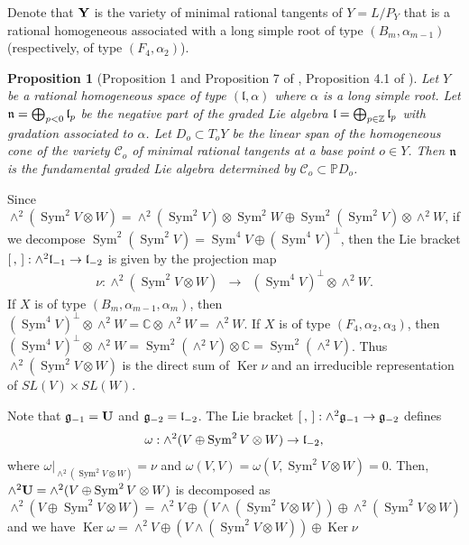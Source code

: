 \documentclass[12pt]{amsart}
\theoremstyle{plain}
\newtheorem{proposition}[theorem]{Proposition}
\theoremstyle{definition}
\def\Sym{\operatorname{Sym}}
\def\Ker{\operatorname{Ker}}
\begin{document}
Denote that ${\bf Y} $ is the variety of minimal rational tangents of $Y=L/P_Y$ that is a rational homogeneous associated with a long simple root of type $(B_m, \alpha_{m-1})$ (respectively, of type $(F_4, \alpha_2)$).

\begin{proposition} [Proposition 1 and Proposition 7 of \cite{HM02}, Proposition 4.1 of \cite{HH}] \label{Vmrt ss-LieAl Str}  Let $Y$ be a rational homogeneous space of type $(\mathfrak l , \alpha)$ where  $\alpha$ is  a long simple root. Let $\mathfrak n=\bigoplus _{p <0} \frak l_p$ be the negative part of the graded Lie algebra  $\frak l=\bigoplus_{p\in \mathbb Z}\frak l_p$ with gradation associated to $\alpha$. Let $D_o \subset T_oY$ be the linear span of the homogeneous cone of the variety $\mathcal C_o$ of minimal rational tangents  at a base point $o \in Y$. Then $\frak n$ is the fundamental graded Lie algebra determined by $ \mathcal C_o \subset \mathbb PD_o$.
\end{proposition}


Since $\wedge^2 (\Sym^2 V \otimes W) = \wedge^2 (\Sym^2 V) \otimes \Sym^2 W \oplus \Sym^2 (\Sym^2 V) \otimes \wedge^2 W$, if we decompose $\Sym^2(\Sym^2 V) = \Sym^4V \oplus (\Sym^4V)^{\perp}$, then the Lie bracket $[\,,\,]:\wedge^2 \frak l_{-1} \rightarrow \frak l_{-2}$ is given by the projection map
\begin{eqnarray*}
  \nu:  \wedge^2 (\Sym^2 V \otimes W) & \to &(\Sym^4V)^{\perp} \otimes \wedge^2 W.
\end{eqnarray*}
If $X$ is of type $(B_m, \alpha_{m-1}, \alpha_m)$, then $(\Sym^4V)^{\perp} \otimes \wedge^2 W =  \mathbb C  \otimes \wedge^2 W =  \wedge^2 W$. If $X$ is of type $(F_4, \alpha_2, \alpha_3)$, then $(\Sym^4V)^{\perp} \otimes \wedge^2 W =   \Sym^2(\wedge^2V)  \otimes \mathbb C=\Sym^2(\wedge^2V)$.
Thus $\wedge^2 (\Sym^2 V \otimes W)$ is the direct sum of $\Ker \nu$ and an irreducible representation of $SL(V) \times SL(W)$.

Note that $\frak g_{-1} ={\bf U}$ and $ \frak g_{-2} =  \frak l_{-2}$. The  Lie bracket $[\,,\,]:\wedge^2 \frak g_{-1} \rightarrow \frak g_{-2}$ defines
$$\omega:\wedge^2 (V\oplus \Sym^2 V \otimes W)  \rightarrow \frak l_{-2},$$  where $\omega|_{\wedge^2 (\Sym^2 V \otimes W)}=\nu$ and $\omega(V,V)= \omega(V, \Sym^2V \otimes W)=0$. Then,  $\wedge^2 {\bf U}=\wedge^2 (V\oplus \Sym^2 V \otimes W)$ is decomposed as
$$\wedge^2 (V\oplus \Sym^2 V \otimes W) = \wedge^2 V\oplus (V \wedge (\Sym^2 V\otimes W))\oplus \wedge^2(\Sym^2 V\otimes W) $$
and we have   $\Ker \omega = \wedge^2 V \oplus (V \wedge (\Sym^2 V\otimes W))\oplus \Ker \nu$ %
\end{document}
